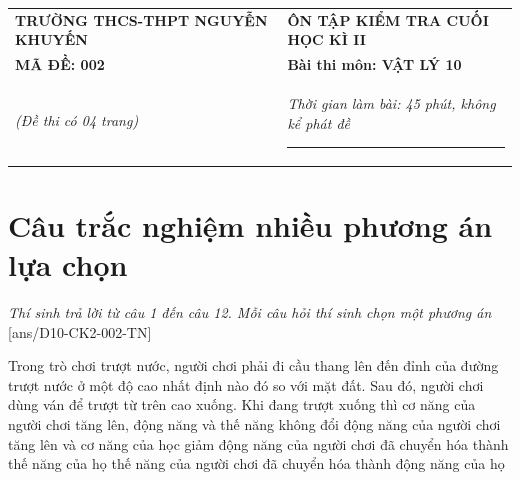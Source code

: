 \begin{center}
	\begin{tabular}{M{9.25cm}M{8.75cm}}
		\textbf{TRƯỜNG THCS-THPT NGUYỄN KHUYẾN}& \textbf{ÔN TẬP KIỂM TRA CUỐI HỌC KÌ II}\\
		\textbf{MÃ ĐỀ: 002}& \textbf{Bài thi môn: VẬT LÝ 10}\\
		\textit{(Đề thi có 04 trang)}& \textit{Thời gian làm bài: 45 phút, không kể phát đề}
		
		\noindent\rule{4cm}{0.8pt} \\
	\end{tabular}
\end{center}
\setcounter{section}{0}
\section{Câu trắc nghiệm nhiều phương án lựa chọn}
\textit{Thí sinh trả lời từ câu 1 đến câu 12. Mỗi câu hỏi thí sinh chọn một phương án}
\setcounter{ex}{0}
[ans/D10-CK2-002-TN]
\begin{ex}
	Trong trò chơi trượt nước, người chơi phải đi cầu thang lên đến đỉnh của đường trượt nước ở một độ cao nhất định nào đó so với mặt đất. Sau đó, người chơi dùng ván để trượt từ trên cao xuống. Khi đang  trượt xuống thì
	\choice
	{cơ năng của người chơi tăng lên, động năng và thế năng không đổi}
	{động năng của người chơi tăng lên và cơ năng của học giảm}
	{động năng của người chơi đã chuyển hóa thành thế năng của họ}
	{\True thế năng của người chơi đã chuyển hóa thành động năng của họ}
	\loigiai{}
\end{ex}
